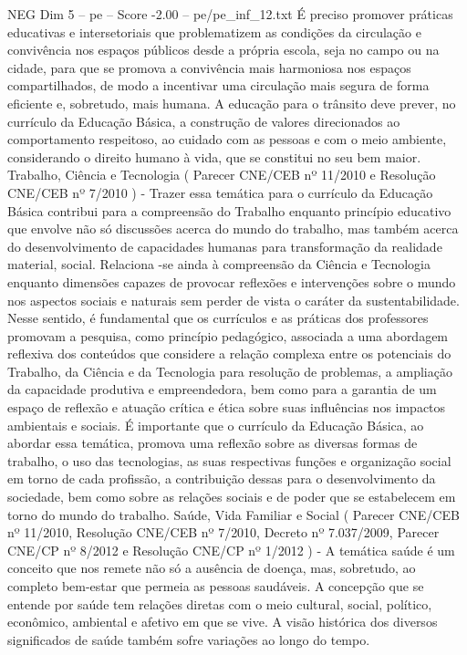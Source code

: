 \begin{textsample}{NEG Dim 5 – pe – Score -2.00 – pe/pe\_inf\_12.txt}
É preciso promover práticas educativas e intersetoriais que problematizem as condições da circulação e convivência nos espaços públicos desde a própria escola, seja no campo ou na cidade, para que se promova a convivência mais harmoniosa nos espaços compartilhados, de modo a incentivar uma circulação mais segura de forma eficiente e, sobretudo, mais humana.
A educação para o trânsito deve prever, no currículo da Educação Básica, a construção de valores direcionados ao comportamento respeitoso, ao cuidado com as pessoas e com o meio ambiente, considerando o direito humano à vida, que se constitui no seu bem maior.
Trabalho, Ciência e Tecnologia ( Parecer CNE/CEB nº 11/2010 e Resolução CNE/CEB nº 7/2010 ) - Trazer essa temática para o currículo da Educação Básica contribui para a compreensão do Trabalho enquanto princípio educativo que envolve não só discussões acerca do mundo do trabalho, mas também acerca do desenvolvimento de capacidades humanas para transformação da realidade material, social.
Relaciona -se ainda à compreensão da Ciência e Tecnologia enquanto dimensões capazes de provocar reflexões e intervenções sobre o mundo nos aspectos sociais e naturais sem perder de vista o caráter da sustentabilidade.
Nesse sentido, é fundamental que os currículos e as práticas dos professores promovam a pesquisa, como princípio pedagógico, associada a uma abordagem reflexiva dos conteúdos que considere a relação complexa entre os potenciais do Trabalho, da Ciência e da Tecnologia para resolução de problemas, a ampliação da capacidade produtiva e empreendedora, bem como para a garantia de um espaço de reflexão e atuação crítica e ética sobre suas influências nos impactos ambientais e sociais.
É importante que o currículo da Educação Básica, ao abordar essa temática, promova uma reflexão sobre as diversas formas de trabalho, o uso das tecnologias, as suas respectivas funções e organização social em torno de cada profissão, a contribuição dessas para o desenvolvimento da sociedade, bem como sobre as relações sociais e de poder que se estabelecem em torno do mundo do trabalho.
Saúde, Vida Familiar e Social ( Parecer CNE/CEB nº 11/2010, Resolução CNE/CEB nº 7/2010, Decreto nº 7.037/2009, Parecer CNE/CP nº 8/2012 e Resolução CNE/CP nº 1/2012 ) - A temática saúde é um conceito que nos remete não só a ausência de doença, mas, sobretudo, ao completo bem-estar que permeia as pessoas saudáveis.
A concepção que se entende por saúde tem relações diretas com o meio cultural, social, político, econômico, ambiental e afetivo em que se vive.
A visão histórica dos diversos significados de saúde também sofre variações ao longo do tempo.

\end{textsample}
